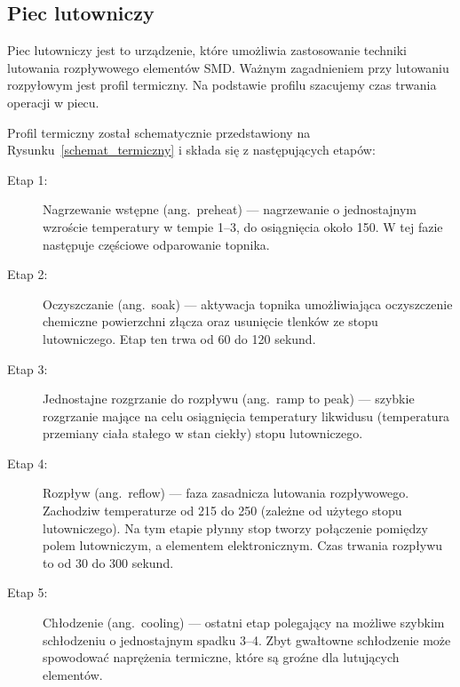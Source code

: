 \subsection{Piec lutowniczy}
Piec lutowniczy jest to urządzenie, które umożliwia zastosowanie techniki lutowania rozpływowego elementów SMD\@. Ważnym zagadnieniem przy lutowaniu rozpyłowym jest profil termiczny. Na podstawie profilu szacujemy czas trwania operacji w piecu.

\breakparagraph{}
Profil termiczny został schematycznie przedstawiony na Rysunku~\ref{schemat_termiczny} i składa się z następujących etapów:
\begin{description}
	\item[Etap 1:] Nagrzewanie wstępne (ang.\ preheat) --- nagrzewanie o jednostajnym wzroście temperatury w tempie 1--3, do osiągnięcia około 150. W tej fazie następuje częściowe odparowanie topnika.
	\item[Etap 2:] Oczyszczanie (ang.\ soak) --- aktywacja topnika umożliwiająca oczyszczenie chemiczne powierzchni złącza oraz usunięcie tlenków ze stopu lutowniczego. Etap ten trwa od 60 do 120 sekund.
	\item[Etap 3:] Jednostajne rozgrzanie do rozpływu (ang.\ ramp to peak) --- szybkie rozgrzanie mające na celu osiągnięcia temperatury likwidusu (temperatura przemiany ciała stałego w stan ciekły) stopu lutowniczego.
	\item[Etap 4:] Rozpływ (ang.\ reflow) --- faza zasadnicza lutowania rozpływowego. Zachodzi\linebreak w temperaturze od 215 do 250 (zależne od użytego stopu lutowniczego). Na tym etapie płynny stop tworzy połączenie pomiędzy polem lutowniczym, a elementem elektronicznym. Czas trwania rozpływu to od 30 do 300 sekund.
	\item[Etap 5:] Chłodzenie (ang.\ cooling) --- ostatni etap polegający na możliwe szybkim schłodzeniu o jednostajnym spadku 3--4. Zbyt gwałtowne schłodzenie może spowodować naprężenia termiczne, które są groźne dla lutujących elementów.
\end{description}

